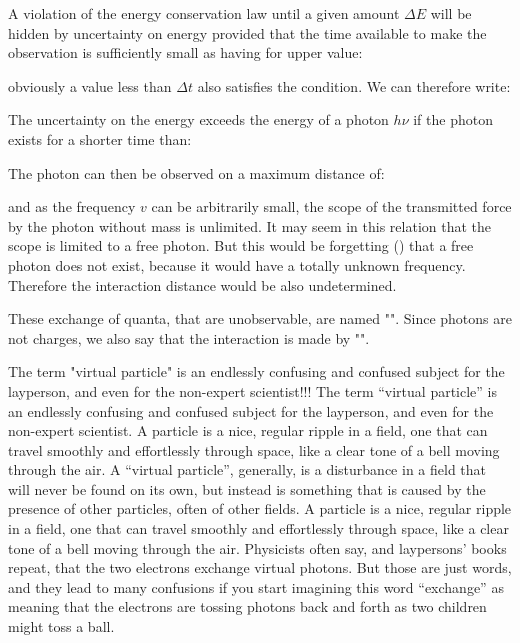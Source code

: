 	A violation of the energy conservation law until a given amount $\Delta E$ will be hidden by uncertainty on energy provided that the time available to make the observation is sufficiently small as having for upper value:
	
	obviously a value less than $\Delta t$ also satisfies the condition. We can therefore write:
	
	The uncertainty on the energy exceeds the energy of a photon $h\nu$ if the photon exists for a shorter time than:
	
	The photon can then be observed on a maximum distance of:
	
	and as the frequency $v$ can be arbitrarily small, the scope of the transmitted force by the photon without mass is unlimited. It may seem in this relation that the scope is limited to a free photon. But this would be forgetting () that a free photon does not exist, because it would have a totally unknown frequency. Therefore the interaction distance would be also undetermined.
	
	These exchange of quanta, that are unobservable, are named "". Since photons are not charges, we also say that the interaction is made by "". 
	
	\begin{tcolorbox}[title=Remark,colframe=black,arc=10pt]
	The term "virtual particle" is an endlessly confusing and confused subject for the layperson, and even for the non-expert scientist!!! The term “virtual particle” is an endlessly confusing and confused subject for the layperson, and even for the non-expert scientist. A particle is a nice, regular ripple in a field, one that can travel smoothly and effortlessly through space, like a clear tone of a bell moving through the air.  A “virtual particle”, generally, is a disturbance in a field that will never be found on its own, but instead is something that is caused by the presence of other particles, often of other fields. A particle is a nice, regular ripple in a field, one that can travel smoothly and effortlessly through space, like a clear tone of a bell moving through the air.  Physicists often say, and laypersons’ books repeat, that the two electrons exchange virtual photons. But those are just words, and they lead to many confusions if you start imagining this word “exchange” as meaning that the electrons are tossing photons back and forth as two children might toss a ball.
	\end{tcolorbox}
	

